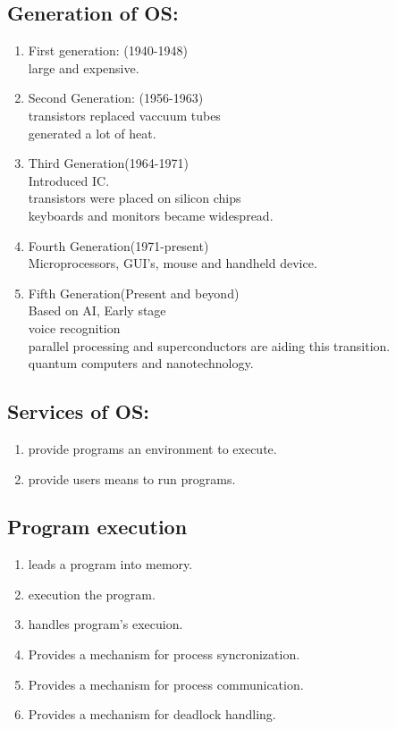 \documentclass[12pt,letterpaper]{article}
\begin{document}
\subsection{Generation of OS:}
\begin{enumerate}
  \item First generation: (1940-1948)\\
    large and expensive.
  \item Second Generation: (1956-1963)\\
    transistors replaced vaccuum tubes\\
    generated a lot of heat. 
  \item Third Generation(1964-1971)\\
    Introduced IC. \\
    transistors were placed on silicon chips\\
    keyboards and monitors became widespread. 
  \item Fourth Generation(1971-present)\\
    Microprocessors, GUI's, mouse and handheld device.
  \item Fifth Generation(Present and beyond)\\
    Based on AI, Early stage\\
    voice recognition\\
    parallel processing and superconductors are aiding this transition.\\
    quantum computers and nanotechnology.
\end{enumerate}

\subsection{Services of OS:}
\begin{enumerate}
  \item provide programs an environment to execute. 
  \item provide users means to run programs. 
\end{enumerate}

\subsection{Program execution}
\begin{enumerate}
  \item leads a program into memory. 
  \item execution the program. 
  \item handles program's execuion. 
  \item Provides a mechanism for process syncronization.
  \item Provides a mechanism for process communication. 
  \item Provides a mechanism for deadlock handling. 
\end{enumerate}
\end{document}
